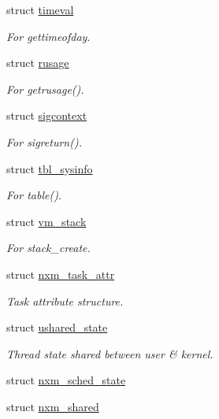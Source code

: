 \begin{DoxyCompactItemize}
struct \hyperlink{structTru64_1_1timeval}{timeval}
\begin{DoxyCompactList}\small\item\em For gettimeofday. \item\end{DoxyCompactList}\item 
struct \hyperlink{structTru64_1_1rusage}{rusage}
\begin{DoxyCompactList}\small\item\em For getrusage(). \item\end{DoxyCompactList}\item 
struct \hyperlink{structTru64_1_1sigcontext}{sigcontext}
\begin{DoxyCompactList}\small\item\em For sigreturn(). \item\end{DoxyCompactList}\item 
struct \hyperlink{structTru64_1_1tbl__sysinfo}{tbl\_\-sysinfo}
\begin{DoxyCompactList}\small\item\em For table(). \item\end{DoxyCompactList}\item 
struct \hyperlink{structTru64_1_1vm__stack}{vm\_\-stack}
\begin{DoxyCompactList}\small\item\em For stack\_\-create. \item\end{DoxyCompactList}\item 
struct \hyperlink{structTru64_1_1nxm__task__attr}{nxm\_\-task\_\-attr}
\begin{DoxyCompactList}\small\item\em Task attribute structure. \item\end{DoxyCompactList}\item 
struct \hyperlink{structTru64_1_1ushared__state}{ushared\_\-state}
\begin{DoxyCompactList}\small\item\em Thread state shared between user \& kernel. \item\end{DoxyCompactList}\item 
struct \hyperlink{structTru64_1_1nxm__sched__state}{nxm\_\-sched\_\-state}
\item 
struct \hyperlink{structTru64_1_1nxm__shared}{nxm\_\-shared}

\end{DoxyCompactItemize}

